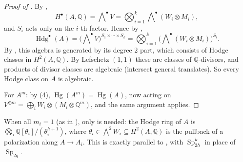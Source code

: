 \documentclass[12pt]{amsart}
\newcommand{\Q}{\mathbb{Q}}
\DeclareMathOperator{\Sp}{Sp}
\DeclareMathOperator{\Hg}{Hg}
\DeclareMathOperator{\Hdg}{Hdg}
\let\oldbigwedge\bigwedge
\renewcommand{\bigwedge}{\mathop{\textstyle\oldbigwedge}\nolimits}
\theoremstyle{definition}
\theoremstyle{remark}
\numberwithin{equation}{section}
\begin{document}
\begin{proof}[Proof of ]
    By ,
    \begin{equation*}
        H^\bullet(A, \Q) = \bigwedge^\bullet V =
        \bigotimes_{i=1}^k \bigwedge^\bullet (W_i \otimes M_i),
    \end{equation*}
    and $S_i$ acts only on the $i$-th factor. Hence by ,
    \begin{equation*}
        \Hdg^\bullet(A) = \big(\bigwedge^\bullet V\big)^{S_1 \times \cdots \times
        S_k} = \bigotimes_{i=1}^k \big(\bigwedge^\bullet(W_i \otimes
        M_i)\big)^{S_i}.
    \end{equation*}
    By , this algebra is generated by its degree $2$ part, which
    consists of Hodge classes in $H^2(A, \Q)$. By Lefschetz $(1,1)$ these are
    classes of $\Q$-divisors, and products of divisor classes are algebraic
    (intersect general translates). So every Hodge class on $A$ is algebraic.

    For $A^m$: by (4), $\Hg(A^m) = \Hg(A)$, now acting on
    $V^{\oplus m} = \bigoplus_i W_i \otimes (M_i \otimes \Q^m)$, and the same
    argument applies.
\end{proof}

\begin{remark}
    When all $m_i = 1$ (as in ), only  is
    needed: the Hodge ring of $A$ is $\bigotimes_i \Q[\theta_i]/(\theta_i^{h+1})$,
    where $\theta_i \in \bigwedge^2 W_i \subseteq H^2(A, \Q)$ is the pullback of a
    polarization along $A \to A_i$. This is exactly parallel to
    , with $\Sp_{2h}^k$ in place of $\Sp_{2g}$.
\end{remark}




\end{document}
